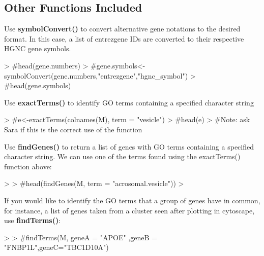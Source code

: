 \documentclass{article}
\begin{document}
\newpage
\subsection*{Other Functions Included}

Use \textbf{symbolConvert()} to convert alternative gene notations to the desired format.  In this case, a list of entrezgene IDs are converted to their respective HGNC gene symbols.

\begin{Schunk}
\begin{Sinput}
> #head(gene.numbers)
> #gene.symbols<-symbolConvert(gene.numbers,"entrezgene","hgnc_symbol")
> #head(gene.symbols)
\end{Sinput}
\end{Schunk}



Use \textbf{exactTerms()} to identify GO terms containing a specified character string
\begin{Schunk}
\begin{Sinput}
> #e<-exactTerms(colnames(M), term = "vesicle")
> #head(e)
> #Note: ask Sara if this is the correct use of the function
\end{Sinput}
\end{Schunk}
\vspace{4mm}
Use \textbf{findGenes()} to return a list of genes with GO terms containing a specified character string.  We can use one of the terms found using the exactTerms() function above:
\begin{Schunk}
\begin{Sinput}
> 
> #head(findGenes(M, term = "acrosomal.vesicle"))
> 
\end{Sinput}
\end{Schunk}
\vspace{4mm}

If you would like to identify the GO terms that a group of genes have in common, for instance, a list of genes taken from a cluster seen after plotting in cytoscape, use \textbf{findTerms()}:
\begin{Schunk}
\begin{Sinput}
> 
> #findTerms(M, geneA = "APOE" ,geneB = "FNBP1L",geneC="TBC1D10A")
\end{Sinput}
\end{Schunk}
\end{document}

